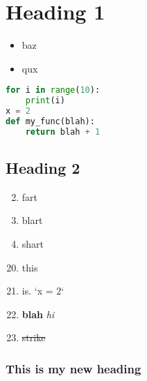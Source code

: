 \documentclass{article}
\begin{document}
\section{Heading 1}
\begin{itemize}
    \item baz
    \item qux
\end{itemize}

\begin{lstlisting}[language=python, style=myStyle]
for i in range(10):
    print(i)
x = 2
def my_func(blah):
    return blah + 1
\end{lstlisting}

\subsection{Heading 2}
\begin{enumerate}
    \setcounter{enumi}{1}
    \item  fart
    \item  blart
    \item  shart
\end{enumerate}

\begin{enumerate}
    \setcounter{enumi}{19}
    \item  this
    \item  is. `x = 2`
    \item  \textbf{blah} \textit{hi}
    \item  \sout{strike}
\end{enumerate}

\subsubsection{This is my new heading}
\end{document}
